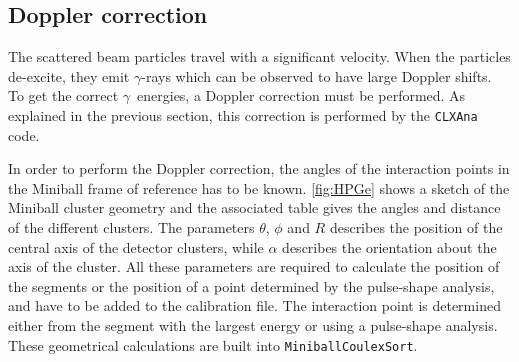 \documentclass[twoside,english]{uiofysmaster/uiofysmaster}
\newcommand{\ga}{$\gamma$}
\let\orgautoref\autoref
\renewcommand{\autoref}
        {%
		 \def\sectionautorefname{Section}%
		 \def\subsectionautorefname{Section}%
		 \def\subsubsectionautorefname{Section}%
		 \def\chapterautorefname{Chapter}%
          \orgautoref}
\begin{document}
%	



\subsection{Doppler correction}\label{ssec:Doppler}
The scattered beam particles travel with a significant velocity.
When the particles de-excite, they emit \ga-rays which can be observed to have large Doppler shifts.
To get the correct \ga\ energies, a Doppler correction must be performed.
As explained in the previous section, this correction is performed by the \texttt{CLXAna} code. 

In order to perform the Doppler correction, the angles of the interaction points in the Miniball frame of reference has to be known. 
\autoref{fig:HPGe} shows a sketch of the Miniball cluster geometry and the associated table gives the angles and distance of the different clusters.
The parameters $\theta$, $\phi$ and $R$ describes the position of the central axis of the detector clusters, while $\alpha$ describes the orientation about the axis of the cluster. 
All these parameters are required to calculate the position of the segments or the position of a point determined by the pulse-shape analysis, and have to be added to the calibration file. 
The interaction point is determined either from the segment with the largest energy or using a pulse-shape analysis. 
These geometrical calculations are built into \texttt{MiniballCoulexSort}.
\end{document}
